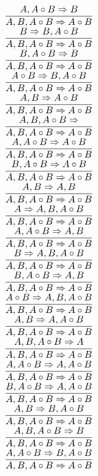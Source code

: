 \documentclass[11pt]{article}
\begin{document}
\begin{center}
\bigskip
\\$\infer{A, B, A\circ B\Rightarrow A\circ B}{A, A\circ B\Rightarrow B}$
\bigskip
\\$\infer{A, B, A\circ B\Rightarrow A\circ B}{B\Rightarrow B, A\circ B}$
\bigskip
\\$\infer{A, B, A\circ B\Rightarrow A\circ B}{B, A\circ B\Rightarrow B}$
\bigskip
\\$\infer{A, B, A\circ B\Rightarrow A\circ B}{A\circ B\Rightarrow B, A\circ B}$
\bigskip
\\$\infer{A, B, A\circ B\Rightarrow A\circ B}{A, B\Rightarrow A\circ B}$
\bigskip
\\$\infer{A, B, A\circ B\Rightarrow A\circ B}{A, B, A\circ B\Rightarrow }$
\bigskip
\\$\infer{A, B, A\circ B\Rightarrow A\circ B}{A, A\circ B\Rightarrow A\circ B}$
\bigskip
\\$\infer{A, B, A\circ B\Rightarrow A\circ B}{B, A\circ B\Rightarrow A\circ B}$
\bigskip
\\$\infer{A, B, A\circ B\Rightarrow A\circ B}{A, B\Rightarrow A, B}$
\bigskip
\\$\infer{A, B, A\circ B\Rightarrow A\circ B}{A\Rightarrow A, B, A\circ B}$
\bigskip
\\$\infer{A, B, A\circ B\Rightarrow A\circ B}{A, A\circ B\Rightarrow A, B}$
\bigskip
\\$\infer{A, B, A\circ B\Rightarrow A\circ B}{B\Rightarrow A, B, A\circ B}$
\bigskip
\\$\infer{A, B, A\circ B\Rightarrow A\circ B}{B, A\circ B\Rightarrow A, B}$
\bigskip
\\$\infer{A, B, A\circ B\Rightarrow A\circ B}{A\circ B\Rightarrow A, B, A\circ B}$
\bigskip
\\$\infer{A, B, A\circ B\Rightarrow A\circ B}{A, B\Rightarrow A, A\circ B}$
\bigskip
\\$\infer{A, B, A\circ B\Rightarrow A\circ B}{A, B, A\circ B\Rightarrow A}$
\bigskip
\\$\infer{A, B, A\circ B\Rightarrow A\circ B}{A, A\circ B\Rightarrow A, A\circ B}$
\bigskip
\\$\infer{A, B, A\circ B\Rightarrow A\circ B}{B, A\circ B\Rightarrow A, A\circ B}$
\bigskip
\\$\infer{A, B, A\circ B\Rightarrow A\circ B}{A, B\Rightarrow B, A\circ B}$
\bigskip
\\$\infer{A, B, A\circ B\Rightarrow A\circ B}{A, B, A\circ B\Rightarrow B}$
\bigskip
\\$\infer{A, B, A\circ B\Rightarrow A\circ B}{A, A\circ B\Rightarrow B, A\circ B}$

\end{center}
\end{document}
